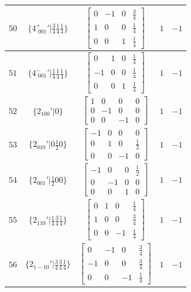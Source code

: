 \documentclass[fleqn,8pt]{jsarticle}
\begin{document}
\begin{longtable}{ccccc}
$ 50 $ & $ \{4^{+}_{\,\,001}{}'|\frac{3}{4} \frac{1}{4} \frac{1}{4}\} $ & $ \begin{bmatrix} 0 & -1 & 0 & \frac{3}{4} \\ 1 & 0 & 0 & \frac{1}{4} \\ 0 & 0 & 1 & \frac{1}{4} \end{bmatrix} $ & $ 1 $ & $ -1 $ \\ \hline
$ 51 $ & $ \{4^{-}_{\,\,001}{}'|\frac{1}{4} \frac{1}{4} \frac{1}{4}\} $ & $ \begin{bmatrix} 0 & 1 & 0 & \frac{1}{4} \\ -1 & 0 & 0 & \frac{1}{4} \\ 0 & 0 & 1 & \frac{1}{4} \end{bmatrix} $ & $ 1 $ & $ -1 $ \\ \hline
$ 52 $ & $ \{2{}_{100}{}'|0\} $ & $ \begin{bmatrix} 1 & 0 & 0 & 0 \\ 0 & -1 & 0 & 0 \\ 0 & 0 & -1 & 0 \end{bmatrix} $ & $ 1 $ & $ -1 $ \\ \hline
$ 53 $ & $ \{2{}_{010}{}'|0 \frac{1}{2} 0\} $ & $ \begin{bmatrix} -1 & 0 & 0 & 0 \\ 0 & 1 & 0 & \frac{1}{2} \\ 0 & 0 & -1 & 0 \end{bmatrix} $ & $ 1 $ & $ -1 $ \\ \hline
$ 54 $ & $ \{2{}_{001}{}'|\frac{1}{2} 0 0\} $ & $ \begin{bmatrix} -1 & 0 & 0 & \frac{1}{2} \\ 0 & -1 & 0 & 0 \\ 0 & 0 & 1 & 0 \end{bmatrix} $ & $ 1 $ & $ -1 $ \\ \hline
$ 55 $ & $ \{2{}_{110}{}'|\frac{1}{4} \frac{3}{4} \frac{1}{4}\} $ & $ \begin{bmatrix} 0 & 1 & 0 & \frac{1}{4} \\ 1 & 0 & 0 & \frac{3}{4} \\ 0 & 0 & -1 & \frac{1}{4} \end{bmatrix} $ & $ 1 $ & $ -1 $ \\ \hline
$ 56 $ & $ \{2{}_{1-10}{}'|\frac{3}{4} \frac{3}{4} \frac{1}{4}\} $ & $ \begin{bmatrix} 0 & -1 & 0 & \frac{3}{4} \\ -1 & 0 & 0 & \frac{3}{4} \\ 0 & 0 & -1 & \frac{1}{4} \end{bmatrix} $ & $ 1 $ & $ -1 $ \\ \hline

\end{longtable}
\end{document}
